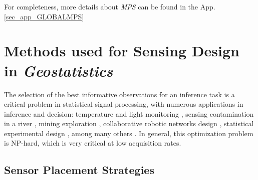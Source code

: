 For completeness, more details about \emph{MPS} can be found in the App. \ref{sec_app_GLOBALMPS}





































\section{Methods used for Sensing Design in \emph{Geostatistics}}
\label{secSecSenIntro}

The selection of the best informative observations for an inference task is a critical problem in statistical signal processing, with numerous applications in inference and decision: temperature and light monitoring \citep{Davis_1995_a, krause08thesis}, sensing contamination in a river \citep{gutjahr1991, christakoskillam1993, christodoulou_2013a}, mining exploration \citep{McBratney1981a, Ortiz2014, aspiebarnes1990}, collaborative robotic networks design \citep{zidek_2000, krause08thesis}, statistical experimental design \citep{Vasat2010, McBratney1981b, magnant_2011a, olea1984_a}, among many others \citep{Krause_2006,Bangerth_2006,Krause_2008b,Guestrin_2005, bittencourthorne1997, xu_2017a}. In general, this optimization problem is NP-hard, which is very critical at low acquisition rates. 


\subsection{Sensor Placement Strategies}


